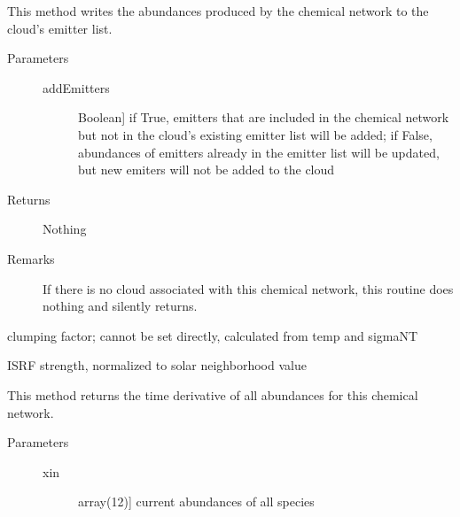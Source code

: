 \documentclass[letterpaper,10pt,english]{sphinxmanual}
\begin{document}
\begin{fulllineitems}
\begin{fulllineitems}
\label{fulldoc:despotic.chemistry.NL99_GC.applyAbundances}
This method writes the abundances produced by the chemical
network to the cloud's emitter list.
\begin{description}
\item[{Parameters}] \leavevmode\begin{description}
\item[{addEmitters}] \leavevmode{[}Boolean{]}
if True, emitters that are included in the chemical
network but not in the cloud's existing emitter list will
be added; if False, abundances of emitters already in the
emitter list will be updated, but new emiters will not be
added to the cloud

\end{description}

\item[{Returns}] \leavevmode
Nothing

\item[{Remarks}] \leavevmode
If there is no cloud associated with this chemical network,
this routine does nothing and silently returns.

\end{description}

\end{fulllineitems}


\begin{fulllineitems}
\label{fulldoc:despotic.chemistry.NL99_GC.cfac}
clumping factor; cannot be set directly, calculated from temp
and sigmaNT

\end{fulllineitems}


\begin{fulllineitems}
\label{fulldoc:despotic.chemistry.NL99_GC.chi}
ISRF strength, normalized to solar neighborhood value

\end{fulllineitems}


\begin{fulllineitems}
\label{fulldoc:despotic.chemistry.NL99_GC.dxdt}
This method returns the time derivative of all abundances for
this chemical network.
\begin{description}
\item[{Parameters}] \leavevmode\begin{description}
\item[{xin}] \leavevmode{[}array(12){]}
current abundances of all species


\end{description}
\end{description}
\end{fulllineitems}
\end{fulllineitems}
\end{document}
